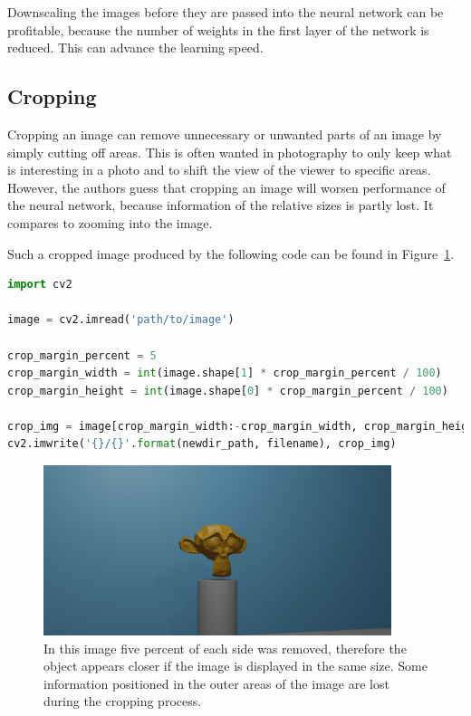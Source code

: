 Downscaling the images before they are passed into the neural network can be profitable, because the number of weights in the first layer of the network is reduced. This can advance the learning speed.

\subsection{Cropping}
Cropping an image can remove unnecessary or unwanted parts of an image by simply cutting off areas. This is often wanted in photography to only keep what is interesting in a photo and to shift the view of the viewer to specific areas. However, the authors guess that cropping an image will worsen performance of the neural network, because information of the relative sizes is partly lost. It compares to zooming into the image.

Such a cropped image produced by the following code can be found in Figure~\ref{pic:implementation_opencv_cropping}.

\begin{lstlisting}[language=python]
import cv2

image = cv2.imread('path/to/image')

crop_margin_percent = 5
crop_margin_width = int(image.shape[1] * crop_margin_percent / 100)
crop_margin_height = int(image.shape[0] * crop_margin_percent / 100)

crop_img = image[crop_margin_width:-crop_margin_width, crop_margin_height:-crop_margin_height]
cv2.imwrite('{}/{}'.format(newdir_path, filename), crop_img)
\end{lstlisting}

\begin{figure}[h!]
	\centering
	\includegraphics[width=4in]{img/implementation_opencv_cropping.jpg}
	\caption{In this image five percent of each side was removed, therefore the object appears closer if the image is displayed in the same size. Some information positioned in the outer areas of the image are lost during the cropping process.}
	\label{pic:implementation_opencv_cropping}
\end{figure}

